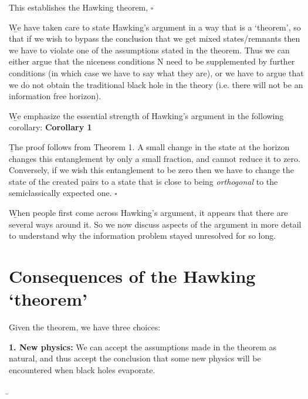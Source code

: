 \documentclass[12pt]{article}
\begin{document}
This establishes the Hawking theorem, \quad $\square$

\b

We have taken care to state Hawking's argument in a way that is a `theorem', so that if we wish to bypass the conclusion that we get mixed states/remnants then we have to violate one of the assumptions stated in the theorem. Thus we can either argue that the niceness conditions N need to be supplemented by further conditions (in which case we have to say what they are), or we have to argue that we do not obtain the traditional black hole in the theory (i.e. there will not be an information free horizon). 

\b

We emphasize the essential strength of Hawking's argument in the following corollary:
\b

{\bf Corollary 1}

\b

The proof follows from Theorem 1. A small change in the state at the horizon changes this entanglement by only a small fraction, and cannot reduce it to zero. Conversely, if we wish this entanglement to be zero then we have to change the state of the created pairs to a state that is close to being {\it orthogonal} to the semiclassically expected one. \quad $\square$

\b

When people first come across Hawking's argument, it appears that there are several ways around it. So we now discuss aspects of the argument in more detail to understand why the information problem stayed unresolved for so long.

\section{Consequences of the Hawking `theorem'}


Given the theorem, we have three choices:

\b

{\bf 1. New physics:} We can accept the assumptions made in the theorem as natural, and thus accept the conclusion that some new physics will be encountered when black holes evaporate. 

\b
\end{document}
